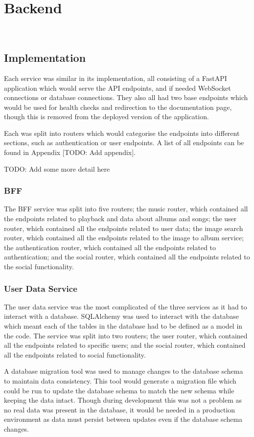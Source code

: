\section{Backend}~\label{sec:backend-development}
\subsection{Implementation}
Each service was similar in its implementation, all consisting of a FastAPI application which would serve the API endpoints, and if needed WebSocket connections or database connections. They also all had two base endpoints which would be used for health checks and redirection to the documentation page, though this is removed from the deployed version of the application.

Each was split into routers which would categorise the endpoints into different sections, such as authentication or user endpoints. A list of all endpoints can be found in Appendix [TODO: Add appendix].

TODO: Add some more detail here

\subsubsection{BFF}
The BFF service was split into five routers; the music router, which contained all the endpoints related to playback and data about albums and songs; the user router, which contained all the endpoints related to user data; the image search router, which contained all the endpoints related to the image to album service; the authentication router, which contained all the endpoints related to authentication; and the social router, which contained all the endpoints related to the social functionality.

\subsubsection{User Data Service}
The user data service was the most complicated of the three services as it had to interact with a database. SQLAlchemy was used to interact with the database which meant each of the tables in the database had to be defined as a model in the code. The service was split into two routers; the user router, which contained all the endpoints related to specific users; and the social router, which contained all the endpoints related to social functionality.

A database migration tool was used to manage changes to the database schema to maintain data consistency. This tool would generate a migration file which could be run to update the database schema to match the new schema while keeping the data intact. Though during development this was not a problem as no real data was present in the database, it would be needed in a production environment as data must persist between updates even if the database schema changes.

